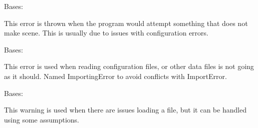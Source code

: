 \documentclass[letterpaper,10pt,english]{sphinxmanual}
\begin{document}

\begin{fulllineitems}
\label{\detokenize{python_docstrings/IfA_Smeargle.meta.errors:IfA_Smeargle.meta.errors.IllogicalProsedureError}}
Bases: {\hyperref[\detokenize{python_docstrings/IfA_Smeargle.meta.errors:IfA_Smeargle.meta.errors.Smeargle_Exception}]{}}

This error is thrown when the program would attempt something that does
not make scene. This is usually due to issues with configuration errors.

\end{fulllineitems}


\begin{fulllineitems}
\label{\detokenize{python_docstrings/IfA_Smeargle.meta.errors:IfA_Smeargle.meta.errors.ImportingError}}
Bases: {\hyperref[\detokenize{python_docstrings/IfA_Smeargle.meta.errors:IfA_Smeargle.meta.errors.Smeargle_Exception}]{}}

This error is used when reading configuration files, or other data files
is not going as it should. Named ImportingError to avoid conflicts with
ImportError.

\end{fulllineitems}


\begin{fulllineitems}
\label{\detokenize{python_docstrings/IfA_Smeargle.meta.errors:IfA_Smeargle.meta.errors.ImportingWarning}}
Bases: {\hyperref[\detokenize{python_docstrings/IfA_Smeargle.meta.errors:IfA_Smeargle.meta.errors.Smeargle_Warning}]{}}

This warning is used when there are issues loading a file, but it can
be handled using some assumptions.

\end{fulllineitems}
\end{document}
